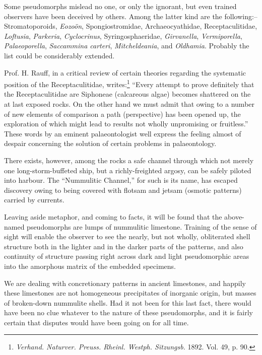 \documentclass[a4paper, 12pt, oneside]{article}
\begin{document}
Some pseudomorphs mislead no one, or only the ignorant, but even trained observers have been deceived by others. Among the latter kind are the following:-- Stromatoporoids, \emph{Eozoön}, Spongiostromidae, Archaeocyathidae, Receptaculitidae, \emph{Loftusia}, \emph{Parkeria}, \emph{Cyclocrinus}, Syringosphaeridae, \emph{Girvanella}, \emph{Vermiporella}, \emph{Palaeoporella}, \emph{Saccammina carteri}, \emph{Mitcheldeania}, and \emph{Oldhamia}. Probably the list could be considerably extended.

Prof. H. Rauff, in a critical review of certain theories regarding the systematic position of the Receptaculitidae, writes:\footnote{\emph{Verhand. Naturver. Preuss. Rheinl. Westph. Sitzungsb.} 1892. Vol. 49, p. 90.} ``Every attempt to prove definitely that the Receptaculitidae are Siphoneae (calcareous algae) becomes shattered on the at last exposed rocks. On the other hand we must admit that owing to a number of new elements of comparison a path (perspective) has been opened up, the exploration of which might lead to results not wholly unpromising or fruitless.'' These words by an eminent palaeontologist well express the feeling almost of despair concerning the solution of certain problems in palaeontology.

There exists, however, among the rocks a safe channel through which not merely one long-storm-buffeted ship, but a richly-freighted argosy, can be safely piloted into harbour. The ``Nummulitic Channel,'' for such is its name, has escaped discovery owing to being covered with flotsam and jetsam (osmotic patterns) carried by currents.

Leaving aside metaphor, and coming to facts, it will be found that the above-named pseudomorphs are lumps of nummulitic limestone. Training of the sense of sight will enable the observer to see the nearly, but not wholly, obliterated shell structure both in the lighter and in the darker parts of the patterns, and also continuity of structure passing right across dark and light pseudomorphic areas into the amorphous matrix of the embedded specimens.

We are dealing with concretionary patterns in ancient limestones, and happily these limestones are not homogeneous precipitates of inorganic origin, but masses of broken-down nummulite shells. Had it not been for this last fact, there would have been no clue whatever to the nature of these pseudomorphs, and it is fairly certain that disputes would have been going on for all time.
\end{document}
